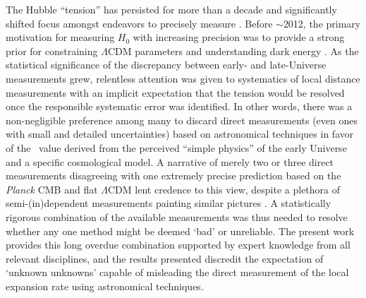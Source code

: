 The Hubble ``tension'' has persisted for more than a decade and significantly shifted focus amongst endeavors to precisely measure \Hcst. Before $\sim$2012, the primary motivation for measuring $H_0$ with increasing precision was to provide a strong prior for constraining $\Lambda$CDM parameters and understanding dark energy \citep[e.g.,][]{Suyu:2012}. As the statistical significance of the discrepancy between early- and late-Universe measurements grew, relentless attention was given to systematics of local distance measurements with an implicit expectation that the tension would be resolved once the responsible systematic error was identified. In other words, there was a non-negligible preference among many to discard direct measurements (even ones with small and detailed uncertainties) based on astronomical techniques in favor of the \Hcst\ value derived from the perceived ``simple physics'' of the early Universe and a specific cosmological model. A narrative of merely two or three direct measurements disagreeing with one extremely precise prediction based on the {\it Planck} CMB and flat $\Lambda$CDM lent credence to this view, despite a plethora of semi-(in)dependent measurements painting similar pictures \citep[e.g.,][and references therein]{CosmoVerse:2025txj}. A statistically rigorous combination of the available measurements was thus needed to resolve whether any one method might be deemed `bad' or unreliable. The present work provides this long overdue combination supported by expert knowledge from all relevant disciplines, and the results presented discredit the expectation of `unknown unknowns' capable of misleading the direct measurement of the local expansion rate using astronomical techniques.

